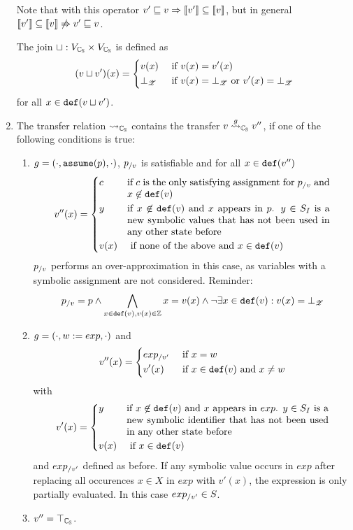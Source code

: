 \begin{enumerate}[leftmargin=*, label=\arabic*.]
	Note that with this operator $v' \sqsubseteq v \Rightarrow [\![ v' ]\!] \subseteq [\![ v ]\!]$, but in general $[\![ v' ]\!] \subseteq [\![ v ]\!] \not\Rightarrow v' \sqsubseteq v$.

	The join $\sqcup : V_{\mathbb{C_{S}}} \times V_{\mathbb{C_{S}}}$ is defined as
	\[(v \sqcup v')(x) = \begin{dcases}
		v(x) & \text{ if } v(x) = v'(x)\\
		\bot_{\mathscr{Z}} & \text{ if } v(x) = \bot_{\mathscr{Z}} \text{ or } v'(x) = \bot_{\mathscr{Z}}
	\end{dcases}\]
	for all $x \in \texttt{def}(v \sqcup v')$.

\item The transfer relation $\rightsquigarrow_{\mathbb{C_{S}}}$ contains the transfer $v \overset{g}{\rightsquigarrow}_{\mathbb{C_{S}}} v''$, if one of the following conditions is true:
	\begin{enumerate}[label = \alph*)]
		\item $g = (\cdot, \texttt{assume}(p), \cdot)$, $p_{/v}$ is satisfiable and for all $x \in \texttt{def}(v'')$
			\[ v''(x) = \begin{dcases}
				c & \parbox[t]{.6\textwidth}{ if $c$ is the only satisfying assignment for $p_\using{v}$ and $x \not\in \defRange(v)$}\\
				y & \parbox[t]{.6\textwidth}{ if $x \not\in \defRange(v)$ and $x$  appears in $p$. $y \in \symIds$ is a new symbolic values that has not been used in any other state before}\\
				v(x) & \text{ if none of the above and } x \in \defRange(v)
			\end{dcases}\]
			$p_{/v}$ performs an over-approximation in this case, as variables with a symbolic assignment are not considered.
			Reminder: \[p_{/v} = p \wedge \bigwedge\limits_{x \in \texttt{def}(v), v(x) \in \mathbb{Z}}  x = v(x) \wedge \neg \exists x \in \texttt{def}(v) : v(x) = \bot_{\mathscr{Z}}\]

		\item $g = (\cdot, w := exp, \cdot)$ and
			\[ v''(x) = \begin{dcases}
				exp_{/v'} & \text{ if } x = w\\
				v'(x) & \text{ if } x \in \texttt{def}(v) \text{ and } x \neq w
			\end{dcases}\]
			with
			\[v'(x) = \begin{dcases}
				y & \parbox[t]{.6\textwidth}{if $x \not \in \defRange(v)$ and $x$ appears in $exp$. $y \in \symIds$ is a new symbolic identifier that has not been used in any other state before}\\
				v(x) & \text{ if } x \in \defRange(v)
			\end{dcases}\]
			and $exp_{/v'}$ defined as before. If any symbolic value occurs in $exp$ after replacing all occurences $x \in X$ in $exp$ with $v'(x)$,
			the expression is only partially evaluated. In this case $exp_{/v'} \in S$.
		\item $v'' = \top_{\mathbb{C_{S}}}$.
	\end{enumerate}


\end{enumerate}
